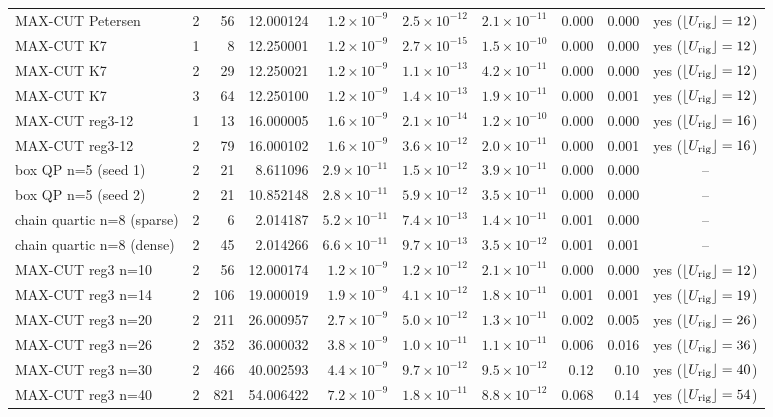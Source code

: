 \begin{tabular}{l c r r r r r r r c}
MAX-CUT Petersen & 2 & 56 & 12.000124 & $1.2\times10^{-9}$ & $2.5\times10^{-12}$ & $2.1\times10^{-11}$ & 0.000 & 0.000 & yes ($\lfloor U_{\rm rig}\rfloor=12$) \\
MAX-CUT K7 & 1 & 8 & 12.250001 & $1.2\times10^{-9}$ & $2.7\times10^{-15}$ & $1.5\times10^{-10}$ & 0.000 & 0.000 & yes ($\lfloor U_{\rm rig}\rfloor=12$) \\
MAX-CUT K7 & 2 & 29 & 12.250021 & $1.2\times10^{-9}$ & $1.1\times10^{-13}$ & $4.2\times10^{-11}$ & 0.000 & 0.000 & yes ($\lfloor U_{\rm rig}\rfloor=12$) \\
MAX-CUT K7 & 3 & 64 & 12.250100 & $1.2\times10^{-9}$ & $1.4\times10^{-13}$ & $1.9\times10^{-11}$ & 0.000 & 0.001 & yes ($\lfloor U_{\rm rig}\rfloor=12$) \\
MAX-CUT reg3-12 & 1 & 13 & 16.000005 & $1.6\times10^{-9}$ & $2.1\times10^{-14}$ & $1.2\times10^{-10}$ & 0.000 & 0.000 & yes ($\lfloor U_{\rm rig}\rfloor=16$) \\
MAX-CUT reg3-12 & 2 & 79 & 16.000102 & $1.6\times10^{-9}$ & $3.6\times10^{-12}$ & $2.0\times10^{-11}$ & 0.000 & 0.001 & yes ($\lfloor U_{\rm rig}\rfloor=16$) \\
box QP n=5 (seed 1) & 2 & 21 & 8.611096 & $2.9\times10^{-11}$ & $1.5\times10^{-12}$ & $3.9\times10^{-11}$ & 0.000 & 0.000 & -- \\
box QP n=5 (seed 2) & 2 & 21 & 10.852148 & $2.8\times10^{-11}$ & $5.9\times10^{-12}$ & $3.5\times10^{-11}$ & 0.000 & 0.000 & -- \\
chain quartic n=8 (sparse) & 2 & 6 & 2.014187 & $5.2\times10^{-11}$ & $7.4\times10^{-13}$ & $1.4\times10^{-11}$ & 0.001 & 0.000 & -- \\
chain quartic n=8 (dense) & 2 & 45 & 2.014266 & $6.6\times10^{-11}$ & $9.7\times10^{-13}$ & $3.5\times10^{-12}$ & 0.001 & 0.001 & -- \\
MAX-CUT reg3 n=10 & 2 & 56 & 12.000174 & $1.2\times10^{-9}$ & $1.2\times10^{-12}$ & $2.1\times10^{-11}$ & 0.000 & 0.000 & yes ($\lfloor U_{\rm rig}\rfloor=12$) \\
MAX-CUT reg3 n=14 & 2 & 106 & 19.000019 & $1.9\times10^{-9}$ & $4.1\times10^{-12}$ & $1.8\times10^{-11}$ & 0.001 & 0.001 & yes ($\lfloor U_{\rm rig}\rfloor=19$) \\
MAX-CUT reg3 n=20 & 2 & 211 & 26.000957 & $2.7\times10^{-9}$ & $5.0\times10^{-12}$ & $1.3\times10^{-11}$ & 0.002 & 0.005 & yes ($\lfloor U_{\rm rig}\rfloor=26$) \\
MAX-CUT reg3 n=26 & 2 & 352 & 36.000032 & $3.8\times10^{-9}$ & $1.0\times10^{-11}$ & $1.1\times10^{-11}$ & 0.006 & 0.016 & yes ($\lfloor U_{\rm rig}\rfloor=36$) \\
MAX-CUT reg3 n=30 & 2 & 466 & 40.002593 & $4.4\times10^{-9}$ & $9.7\times10^{-12}$ & $9.5\times10^{-12}$ & 0.12 & 0.10 & yes ($\lfloor U_{\rm rig}\rfloor=40$) \\
MAX-CUT reg3 n=40 & 2 & 821 & 54.006422 & $7.2\times10^{-9}$ & $1.8\times10^{-11}$ & $8.8\times10^{-12}$ & 0.068 & 0.14 & yes ($\lfloor U_{\rm rig}\rfloor=54$) \\
\bottomrule\end{tabular}
